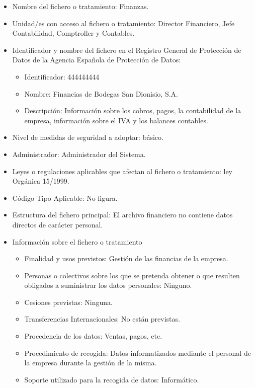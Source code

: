 \documentclass[a4paper,11pt,bibtotoc,noliststotoc]{scrbook}
\newcommand{\laorganizacion}{Bodegas San Dionisio, S.A.}
\begin{document}
\begin{itemize}
\item Nombre del fichero o tratamiento: Finanzas.

\item Unidad/es con acceso al fichero o tratamiento: Director Financiero, Jefe Contabilidad, Comptroller y Contables.

\item Identificador y nombre del fichero en el Registro General de Protección de Datos de la Agencia Española de Protección de Datos: 
	\begin{itemize}
	\item Identificador: 444444444
	\item Nombre: Financias de \laorganizacion
	\item Descripción: Información sobre los cobros, pagos, la contabilidad de la empresa, información sobre el IVA y los balances contables.
	\end{itemize}

\item Nivel de medidas de seguridad a adoptar: básico.

\item Administrador: Administrador del Sistema.

\item Leyes o regulaciones aplicables que afectan al fichero o tratamiento: ley Orgánica 15/1999.

\item Código Tipo Aplicable: No figura.

\item Estructura del fichero principal: El archivo financiero no contiene datos directos de carácter personal.

\item Información sobre el fichero o tratamiento
	\begin{itemize}
	\item Finalidad y usos previstos: Gestión de las financias de la empresa.
	\item Personas o colectivos sobre los que se pretenda obtener o que resulten obligados a suministrar los datos personales: Ninguno.
	\item Cesiones previstas: Ninguna.
	\item Transferencias Internacionales: No están previstas.
	\item Procedencia de los datos: Ventas, pagos, etc.
	\item Procedimiento de recogida: Datos informatizados mediante el personal de la empresa durante la gestión de la misma.
	\item Soporte utilizado para la recogida de datos: Informático.
	\end{itemize}


\end{itemize}
\end{document}

